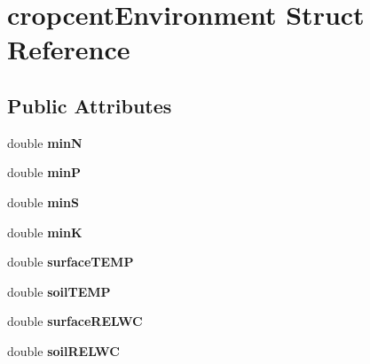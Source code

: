 \hypertarget{structcropcent_environment}{\section{cropcent\-Environment Struct Reference}
\label{structcropcent_environment}
}
\subsection*{Public Attributes}
\begin{DoxyCompactItemize}
\item 
\hypertarget{structcropcent_environment_aa3b907d609d0cd8fe4bcb73cf3c6e1fd}{double {\bfseries min\-N}}\label{structcropcent_environment_aa3b907d609d0cd8fe4bcb73cf3c6e1fd}

\item 
\hypertarget{structcropcent_environment_a4591bb212880fe0e784d0e68856b4b72}{double {\bfseries min\-P}}\label{structcropcent_environment_a4591bb212880fe0e784d0e68856b4b72}

\item 
\hypertarget{structcropcent_environment_a82c39286636c18afe35f005cd299c3a5}{double {\bfseries min\-S}}\label{structcropcent_environment_a82c39286636c18afe35f005cd299c3a5}

\item 
\hypertarget{structcropcent_environment_ad06b9d86d69ba2dc6c9d8941f6cd813d}{double {\bfseries min\-K}}\label{structcropcent_environment_ad06b9d86d69ba2dc6c9d8941f6cd813d}

\item 
\hypertarget{structcropcent_environment_a99240c8b6cc03065e2250f23204fefda}{double {\bfseries surface\-T\-E\-M\-P}}\label{structcropcent_environment_a99240c8b6cc03065e2250f23204fefda}

\item 
\hypertarget{structcropcent_environment_a72147d1b63427a5a1ca44a16eea5abf0}{double {\bfseries soil\-T\-E\-M\-P}}\label{structcropcent_environment_a72147d1b63427a5a1ca44a16eea5abf0}

\item 
\hypertarget{structcropcent_environment_a00ebd8f2fb63793140c7cfdcf3b88cd3}{double {\bfseries surface\-R\-E\-L\-W\-C}}\label{structcropcent_environment_a00ebd8f2fb63793140c7cfdcf3b88cd3}

\item 
\hypertarget{structcropcent_environment_a10ec3adcee84df6e7dfe92ef9027c84b}{double {\bfseries soil\-R\-E\-L\-W\-C}}\label{structcropcent_environment_a10ec3adcee84df6e7dfe92ef9027c84b}


\end{DoxyCompactItemize}
